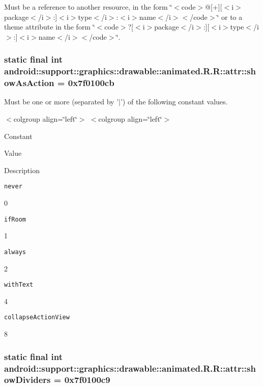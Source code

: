 Must be a reference to another resource, in the form \char`\"{}$<$code$>$@\mbox{[}+\mbox{]}\mbox{[}$<$i$>$package$<$/i$>$:\mbox{]}$<$i$>$type$<$/i$>$:$<$i$>$name$<$/i$>$$<$/code$>$\char`\"{} or to a theme attribute in the form \char`\"{}$<$code$>$?\mbox{[}$<$i$>$package$<$/i$>$:\mbox{]}\mbox{[}$<$i$>$type$<$/i$>$:\mbox{]}$<$i$>$name$<$/i$>$$<$/code$>$\char`\"{}. \hypertarget{classandroid_1_1support_1_1graphics_1_1drawable_1_1animated_1_1_r_1_1attr_08125ad0d0bae12ac63c3aee75c2a69d}{
\subsubsection[{showAsAction}]{\setlength{\rightskip}{0pt plus 5cm}static final int android::support::graphics::drawable::animated.R.R::attr::showAsAction = 0x7f0100cb}}
\label{classandroid_1_1support_1_1graphics_1_1drawable_1_1animated_1_1_r_1_1attr_08125ad0d0bae12ac63c3aee75c2a69d}


Must be one or more (separated by '$|$') of the following constant values. \begin{TabularC}{0}
\hline
\end{TabularC}
$<$colgroup align=\char`\"{}left\char`\"{}$>$ $<$colgroup align=\char`\"{}left\char`\"{}$>$ 

Constant

Value

Description 

{\tt never}

0

{\tt ifRoom}

1

{\tt always}

2

{\tt withText}

4

{\tt collapseActionView}

8\hypertarget{classandroid_1_1support_1_1graphics_1_1drawable_1_1animated_1_1_r_1_1attr_d1adc7bc1e7c3d073f137c8b26c00fe0}{
\subsubsection[{showDividers}]{\setlength{\rightskip}{0pt plus 5cm}static final int android::support::graphics::drawable::animated.R.R::attr::showDividers = 0x7f0100c9}}
\label{classandroid_1_1support_1_1graphics_1_1drawable_1_1animated_1_1_r_1_1attr_d1adc7bc1e7c3d073f137c8b26c00fe0}



